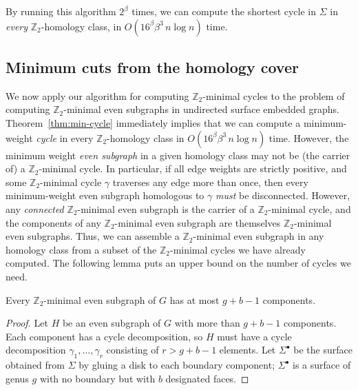 \documentclass[letterpaper,review]{siamart190516}
\def\Z{\mathbb{Z}}
\begin{document}
{By running this algorithm $2^\beta$ times, we can compute the shortest cycle in $\Sigma$ in
\emph{every} $\Z_2$-homology class, in $O(16^\beta \beta^3\, n\log n)$ time.
%



\subsection{Minimum cuts from the homology cover}
\label{sec:homcover_mincut}

We now apply our algorithm for computing $\Z_2$-minimal cycles to the problem of computing $\Z_2$-minimal even subgraphs in undirected surface embedded graphs.
Theorem~\ref{thm:min-cycle} immediately implies that we can compute a minimum-weight \emph{cycle} in
every $\Z_2$-homology class in $O(16^\beta \beta^3\, n\log n)$ time.  However, the minimum weight \emph{even subgraph} in a given homology class may not be (the carrier of) a $\Z_2$-minimal cycle.  In particular, if all edge weights are strictly positive, and some $\Z_2$-minimal cycle $\gamma$ traverses any edge more than once, then every minimum-weight even subgraph homologous to $\gamma$ \emph{must} be disconnected.
However, any \emph{connected} $\Z_2$-minimal even subgraph is the carrier of a $\Z_2$-minimal cycle, and the components of any $\Z_2$-minimal even subgraph are themselves $\Z_2$-minimal even subgraphs.  Thus, we can assemble a $\Z_2$-minimal even subgraph in any homology class from a subset of the $\Z_2$-minimal cycles we have already computed.  The following lemma puts an upper bound on the number of cycles we need.

\begin{lemma}
\label{lem:even-comps}
Every $\Z_2$-minimal even subgraph of $G$ has at most $g+b-1$ components.
\end{lemma}

\begin{proof}
Let $H$ be an even subgraph of $G$ with more than $g+b-1$ components.  Each component has a cycle decomposition, so $H$ must have a cycle decomposition $\gamma_1, \dots, \gamma_r$ consisting of $r > g+b-1$ elements.  Let $\Sigma^\bullet$ be the surface obtained from $\Sigma$ by gluing a disk to each boundary component; $\Sigma^\bullet$ is a surface of genus $g$ with no boundary but with $b$ designated faces.


\end{proof}}
\end{document}
